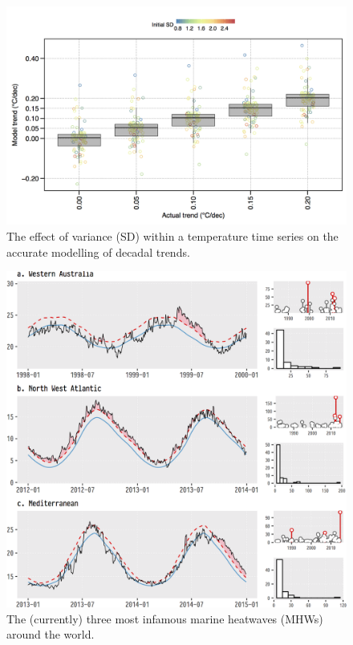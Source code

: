 \documentclass[
]{book}
\begin{document}
\begin{figure}

{\centering \includegraphics[width=1\linewidth]{figures/all_plt0_no_interp_natural} 

}

\caption{The effect of variance (SD) within a temperature time series on the accurate modelling of decadal trends.}\label{fig:example1}
\end{figure}

\begin{figure}

{\centering \includegraphics[width=1\linewidth]{figures/deeper-infamous-event-plots-1} 

}

\caption{The (currently) three most infamous marine heatwaves (MHWs) around the world.}\label{fig:example2}
\end{figure}
\end{document}
